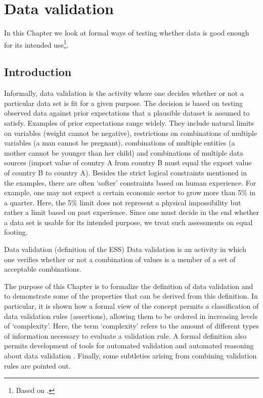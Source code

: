 \chapter{Data validation}
\label{sect:datavalidation}
In this Chapter we look at formal ways of testing whether data
is good enough for its intended use\footnote{Based on \citet{loo2020data}.}.

\section{Introduction}



Informally, data validation is the activity where one decides whether or not a
particular data set is fit for a given purpose. The decision is based on
testing observed data against prior expectations that a plausible dataset is
assumed to satisfy. Examples of prior expectations range widely. They include
natural limits on variables (weight cannot be negative), restrictions on
combinations of multiple variables (a man cannot be pregnant), combinations of
multiple entities (a mother cannot be younger than her child) and combinations
of multiple data sources (import value of country A from country B must equal
the export value of country B to country A). Besides the strict logical
constraints mentioned in the examples, there are often `softer' constraints
based on human experience. For example, one may not expect a certain economic
sector to grow more than 5\% in a quarter. Here, the 5\% limit does not
represent a physical impossibility but rather a limit based on past experience.
Since one must decide in the end whether a data set is usable for its intended
purpose, we treat such assessments on equal footing.

\begin{terminology}{Data validation (definition of the ESS)} 
Data validation is an activity in which one verifies whether or not a
combination of values is a member of a set of acceptable combinations.
\end{terminology}

The purpose of this Chapter is to formalize the definition of data validation
and to demonstrate some of the properties that can be derived from this
definition.  In particular, it is shown how a formal view of the concept
permits a classification of data validation rules (assertions), allowing them
to be ordered in increasing levels of `complexity'. Here, the term `complexity'
refers to the amount of different types of information necessary to evaluate a
validation rule. A formal definition also permits development of tools for
automated validation and automated reasoning about data validation
\citep{zio2015methodology, loo2018statistical, loo2019infrastructure}. Finally,
some subtleties arising from combining validation rules are pointed out.



